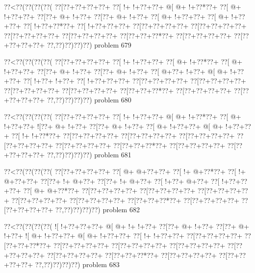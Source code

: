 \vbox{\vbox{\goo
\0??<\0??(\0??(\0??(\0??(
\0??[\0??+\0??+\0??+\0??+
\0??[\- !+\- !+\0??+\0??+
\- @[\- @+\- !+\0??*\0??+
\0??[\- @+\- !+\0??+\0??+
\0??[\0??+\- @+\- !+\0??+
\0??[\0??+\- @+\- !+\0??+
\0??[\- @+\- !+\0??+\0??+
\0??[\- @+\- !+\0??+\0??+
\0??[\- !+\0??+\0??*\0??+
\0??[\- !+\0??+\0??+\0??+
\0??[\0??+\0??+\0??+\0??+
\0??[\0??+\0??+\0??+\0??+
\0??[\0??+\0??+\0??+\0??+
\0??[\0??+\0??+\0??+\0??+
\0??[\0??+\0??+\0??*\0??+
\0??[\0??+\0??+\0??+\0??+
\0??[\0??+\0??+\0??+\0??+
\0??,\0??)\0??)\0??)\0??)
}
\hfil problem 679\hfil\break
}

\vbox{\vbox{\goo
\0??<\0??(\0??(\0??(\0??(
\0??[\0??+\0??+\0??+\0??+
\0??[\- !+\- !+\0??+\0??+
\0??[\- @+\- !+\0??*\0??+
\0??[\- @+\- !+\0??+\0??+
\0??[\0??+\- @+\- !+\0??+
\0??[\0??+\- @+\- !+\0??+
\0??[\- @+\0??+\- !+\0??+
\- @[\- @+\- !+\0??+\0??+
\0??[\- !+\0??+\- !+\0??+
\0??[\- !+\0??+\0??+\0??+
\0??[\0??+\0??+\0??+\0??+
\0??[\0??+\0??+\0??+\0??+
\0??[\0??+\0??+\0??+\0??+
\0??[\0??+\0??+\0??+\0??+
\0??[\0??+\0??+\0??*\0??+
\0??[\0??+\0??+\0??+\0??+
\0??[\0??+\0??+\0??+\0??+
\0??,\0??)\0??)\0??)\0??)
}
\hfil problem 680\hfil\break
}

\vbox{\vbox{\goo
\0??<\0??(\0??(\0??(\0??(
\0??[\0??+\0??+\0??+\0??+
\0??[\- !+\- !+\0??+\0??+
\- @[\- @+\- !+\0??*\0??+
\0??[\- @+\- !+\0??+\0??+
\- ![\0??+\- @+\- !+\0??+
\0??[\0??+\- @+\- !+\0??+
\0??[\- @+\- !+\0??+\0??+
\- @[\- @+\- !+\0??+\0??+
\0??[\- !+\- !+\0??*\0??+
\0??[\0??+\0??+\0??+\0??+
\0??[\0??+\0??+\0??+\0??+
\0??[\0??+\0??+\0??+\0??+
\0??[\0??+\0??+\0??+\0??+
\0??[\0??+\0??+\0??+\0??+
\0??[\0??+\0??+\0??*\0??+
\0??[\0??+\0??+\0??+\0??+
\0??[\0??+\0??+\0??+\0??+
\0??,\0??)\0??)\0??)\0??)
}
\hfil problem 681\hfil\break
}

\vbox{\vbox{\goo
\0??<\0??(\0??(\0??(\0??(
\0??[\0??+\0??+\0??+\0??+
\0??[\- @+\- @+\0??+\0??+
\0??[\- !+\- @+\0??*\0??+
\0??[\- !+\- @+\0??+\0??+
\0??[\0??+\- !+\- @+\0??+
\0??[\0??+\- !+\- @+\0??+
\0??[\- !+\0??+\- @+\0??+
\0??[\- !+\0??+\0??+\0??+
\0??[\- @+\- @+\0??*\0??+
\0??[\0??+\0??+\0??+\0??+
\0??[\0??+\0??+\0??+\0??+
\0??[\0??+\0??+\0??+\0??+
\0??[\0??+\0??+\0??+\0??+
\0??[\0??+\0??+\0??+\0??+
\0??[\0??+\0??+\0??*\0??+
\0??[\0??+\0??+\0??+\0??+
\0??[\0??+\0??+\0??+\0??+
\0??,\0??)\0??)\0??)\0??)
}
\hfil problem 682\hfil\break
}

\vbox{\vbox{\goo
\0??<\0??(\0??(\0??(\0??(
\- ![\- !+\0??+\0??+\0??+
\- @[\- @+\- !+\- !+\0??+
\0??[\0??+\- @+\- !+\0??+
\0??[\0??+\- @+\- !+\0??+
\- ![\- @+\- !+\0??+\0??+
\- @[\- @+\- !+\0??+\0??+
\0??[\- !+\- !+\0??+\0??+
\0??[\0??+\0??+\0??+\0??+
\0??[\0??+\0??+\0??*\0??+
\0??[\0??+\0??+\0??+\0??+
\0??[\0??+\0??+\0??+\0??+
\0??[\0??+\0??+\0??+\0??+
\0??[\0??+\0??+\0??+\0??+
\0??[\0??+\0??+\0??+\0??+
\0??[\0??+\0??+\0??*\0??+
\0??[\0??+\0??+\0??+\0??+
\0??[\0??+\0??+\0??+\0??+
\0??,\0??)\0??)\0??)\0??)
}
\hfil problem 683\hfil\break
}

